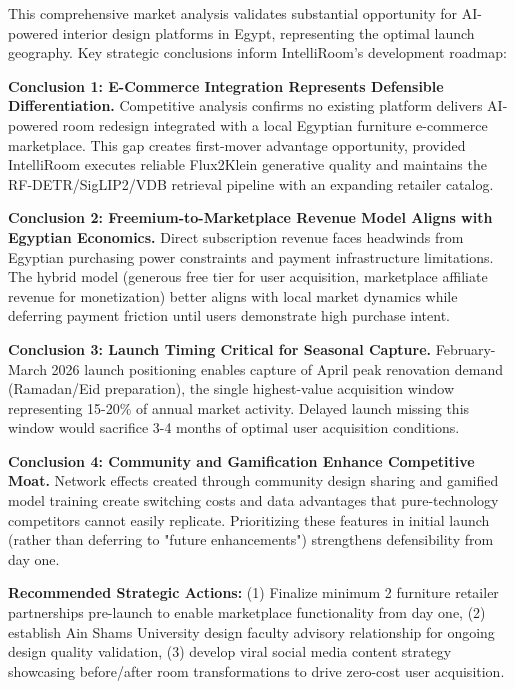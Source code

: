 This comprehensive market analysis validates substantial opportunity for AI-powered interior design platforms in Egypt, representing the optimal launch geography. Key strategic conclusions inform IntelliRoom's development roadmap:

\textbf{Conclusion 1: E-Commerce Integration Represents Defensible Differentiation.} Competitive analysis confirms no existing platform delivers AI-powered room redesign integrated with a local Egyptian furniture e-commerce marketplace. This gap creates first-mover advantage opportunity, provided IntelliRoom executes reliable Flux2Klein generative quality and maintains the RF-DETR/SigLIP2/VDB retrieval pipeline with an expanding retailer catalog.

\textbf{Conclusion 2: Freemium-to-Marketplace Revenue Model Aligns with Egyptian Economics.} Direct subscription revenue faces headwinds from Egyptian purchasing power constraints and payment infrastructure limitations. The hybrid model (generous free tier for user acquisition, marketplace affiliate revenue for monetization) better aligns with local market dynamics while deferring payment friction until users demonstrate high purchase intent.

\textbf{Conclusion 3: Launch Timing Critical for Seasonal Capture.} February-March 2026 launch positioning enables capture of April peak renovation demand (Ramadan/Eid preparation), the single highest-value acquisition window representing 15-20\% of annual market activity. Delayed launch missing this window would sacrifice 3-4 months of optimal user acquisition conditions.

\textbf{Conclusion 4: Community and Gamification Enhance Competitive Moat.} Network effects created through community design sharing and gamified model training create switching costs and data advantages that pure-technology competitors cannot easily replicate. Prioritizing these features in initial launch (rather than deferring to "future enhancements") strengthens defensibility from day one.

\textbf{Recommended Strategic Actions:} (1) Finalize minimum 2 furniture retailer partnerships pre-launch to enable marketplace functionality from day one, (2) establish Ain Shams University design faculty advisory relationship for ongoing design quality validation, (3) develop viral social media content strategy showcasing before/after room transformations to drive zero-cost user acquisition.

